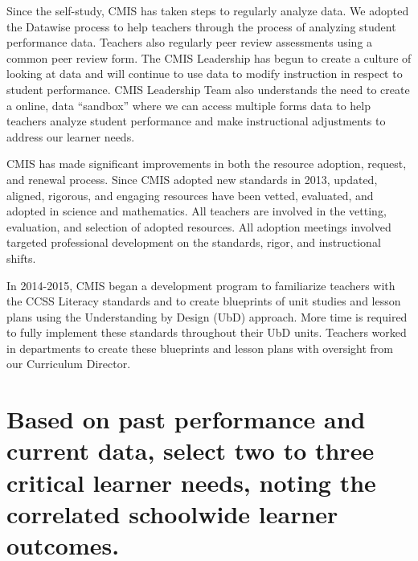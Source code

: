 Since the self-study, CMIS has taken steps to regularly analyze data. We adopted the Datawise process to help teachers through the process of analyzing student performance data. Teachers also regularly peer review assessments using a common peer review form. The CMIS Leadership has begun to create a culture of looking at data and will continue to use data to modify instruction in respect to student performance. CMIS Leadership Team also understands the need to create a online, data “sandbox” where we can access multiple forms data to help teachers analyze student performance and make instructional adjustments to address our learner needs.

CMIS has made significant improvements in both the resource adoption, request, and renewal process. Since CMIS adopted new standards in 2013, updated, aligned, rigorous, and engaging resources have been vetted, evaluated, and adopted in science and mathematics. All teachers are involved in the vetting, evaluation, and selection of adopted resources. All adoption meetings involved targeted professional development on the standards, rigor, and instructional shifts. 

In 2014-2015, CMIS began a development program to familiarize teachers with the CCSS Literacy standards and to create blueprints of unit studies and lesson plans using the Understanding by Design (UbD) approach. More time is required to fully implement these standards throughout their UbD units. Teachers worked in departments to create these blueprints and lesson plans with oversight from our Curriculum Director.  





\section{Based on past performance and current data, select two to three critical learner needs, noting the correlated schoolwide learner outcomes.}


